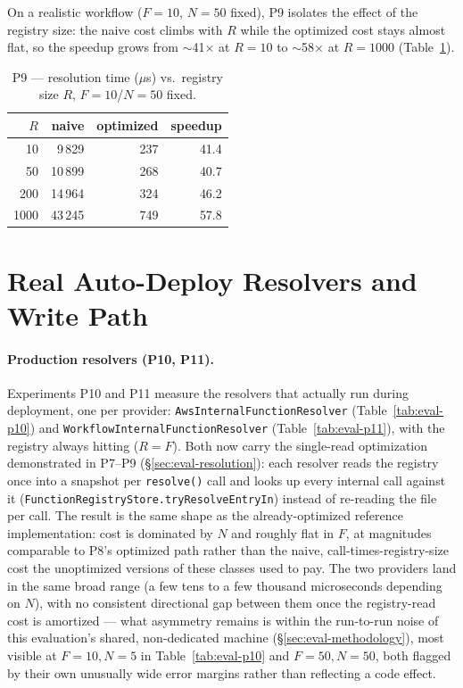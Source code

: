 On a realistic workflow ($F{=}10$, $N{=}50$ fixed), P9 isolates the effect of the registry size:
the naive cost climbs with $R$ while the optimized cost stays almost flat, so the speedup grows
from $\sim$41$\times$ at $R{=}10$ to $\sim$58$\times$ at $R{=}1000$ (Table~\ref{tab:eval-p9}).

\begin{table}[htbp]
  \centering
  \caption{P9 --- resolution time ($\mu$s) vs.\ registry size $R$, $F{=}10$/$N{=}50$ fixed.}
  \label{tab:eval-p9}
  \begin{tabular}{rrrr}
    \hline
    \textbf{$R$} & \textbf{naive} & \textbf{optimized} & \textbf{speedup} \\
    \hline
    10   & 9\,829  & 237 & 41.4 \\
    50   & 10\,899 & 268 & 40.7 \\
    200  & 14\,964 & 324 & 46.2 \\
    1000 & 43\,245 & 749 & 57.8 \\
    \hline
  \end{tabular}
\end{table}

\section{Real Auto-Deploy Resolvers and Write Path}
\label{sec:eval-real-resolvers}

\paragraph{Production resolvers (P10, P11).}
Experiments P10 and P11 measure the resolvers that actually run during deployment, one per
provider: \texttt{Aws\allowbreak Internal\allowbreak Function\allowbreak Resolver} (Table~\ref{tab:eval-p10}) and
\texttt{Workflow\allowbreak Internal\allowbreak Function\allowbreak Resolver} (Table~\ref{tab:eval-p11}), with the
registry always hitting ($R{=}F$). Both now carry the single-read optimization demonstrated in
P7--P9 (\S\ref{sec:eval-resolution}): each resolver reads the registry once into a snapshot per
\texttt{resolve()} call and looks up every internal call against it
(\texttt{FunctionRegistryStore.tryResolveEntryIn}) instead of re-reading the file per call. The
result is the same shape as the already-optimized reference implementation: cost is dominated by
$N$ and roughly flat in $F$, at magnitudes comparable to P8's optimized path rather than the
naive, call-times-registry-size cost the unoptimized versions of these classes used to pay. The
two providers land in the same broad range (a few tens to a few thousand microseconds depending on
$N$), with no consistent directional gap between them once the registry-read cost is amortized
--- what asymmetry remains is within the run-to-run noise of this evaluation's shared,
non-dedicated machine (\S\ref{sec:eval-methodology}), most visible at $F{=}10,N{=}5$ in
Table~\ref{tab:eval-p10} and $F{=}50,N{=}50$, both flagged by their own unusually wide error
margins rather than reflecting a code effect.

